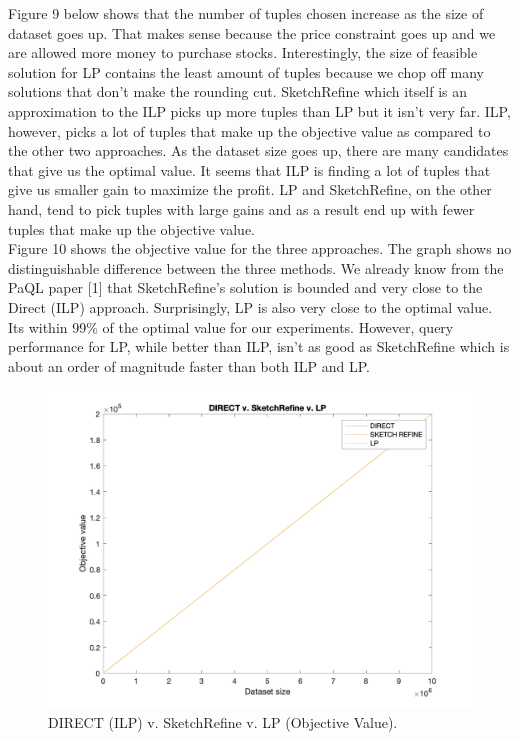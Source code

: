 \documentclass[a4paper,12pt]{article}
\begin{document}
Figure 9 below shows that the number of tuples chosen increase as the size of dataset goes up. That makes sense because the price constraint goes up and we are allowed more money to purchase stocks. Interestingly, the size of feasible solution for LP contains the least amount of tuples because we chop off many solutions that don't make the rounding cut. SketchRefine which itself is an approximation to the ILP picks up more tuples than LP but it isn't very far. ILP, however, picks a lot of tuples that make up the objective value as compared to the other two approaches. As the dataset size goes up, there are many candidates that give us the optimal value. It seems that ILP is finding a lot of tuples that give us smaller gain to maximize the profit. LP and SketchRefine, on the other hand, tend to pick tuples with large gains and as a result end up with fewer tuples that make up the objective value.
\\

Figure 10 shows the objective value for the three approaches. The graph shows no distinguishable difference between the three methods. We already know from the PaQL paper [1] that SketchRefine's solution is bounded and very close to the Direct (ILP) approach. Surprisingly, LP is also very close to the optimal value. Its within 99\% of the optimal value for our experiments. However, query performance for LP, while better than ILP, isn't as good as SketchRefine which is about an order of magnitude faster than both ILP and LP. 
\\
\begin{figure}[h]
\includegraphics[scale=.4]{8.png}
\caption{DIRECT (ILP) v. SketchRefine v. LP (Objective Value).}
\centering
\end{figure}
\end{document}
